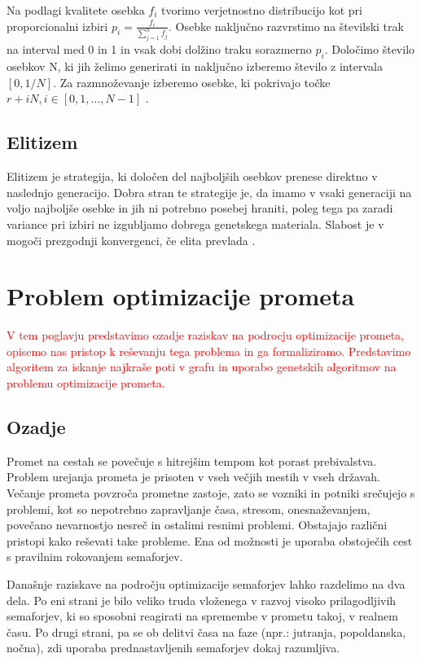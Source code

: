 \documentclass[a4paper, 12pt]{book}
\begin{document}
Na podlagi kvalitete osebka $f_i$ tvorimo verjetnostno distribucijo kot pri proporcionalni izbiri
$p_i = \frac{f_i}{\sum_{j=1}^n f_j}$. Osebke naklju\v cno razvrstimo na \v stevilski trak na interval med 0 in 1 in vsak dobi dol\v zino traku sorazmerno $p_i$. Dolo\v cimo \v stevilo osebkov N, ki jih \v zelimo generirati in naklju\v cno izberemo \v stevilo z intervala $[0, 1/N]$. Za razmno\v zevanje izberemo osebke, ki pokrivajo to\v cke $r + iN, i \in [0, 1, \dots, N -1]$ \cite{inteligentni sistemi}.

\section{Elitizem}
Elitizem je strategija, ki dolo\v cen del najbolj\v sih osebkov prenese direktno v naslednjo generacijo. Dobra stran te strategije je, da imamo v vsaki generaciji na voljo najbolj\v se osebke in jih ni potrebno posebej hraniti, poleg tega pa zaradi variance pri izbiri ne izgubljamo dobrega genetskega materiala. Slabost je v mogo\v ci prezgodnji konvergenci, \v ce elita prevlada
\cite{inteligentni sistemi}.

\chapter{Problem optimizacije prometa}
\label{ch2}
\textcolor{red}{V tem poglavju predstavimo ozadje raziskav na podrocju optimizacije prometa, opisemo nas pristop k re\v sevanju tega problema in ga formaliziramo. Predstavimo algoritem za iskanje najkra\v se poti v grafu in uporabo genetskih algoritmov na problemu optimizacije prometa.}

\section{Ozadje}
Promet na cestah se pove\v cuje s hitrej\v sim tempom kot porast prebivalstva. Problem urejanja prometa je prisoten v vseh ve\v cjih mestih v vseh dr\v zavah. Ve\v canje prometa povzro\v ca prometne zastoje, zato se vozniki in potniki sre\v cujejo s problemi, kot so nepotrebno zapravljanje \v casa, stresom, onesna\v zevanjem, pove\v cano nevarnostjo nesre\v c in ostalimi resnimi problemi. Obstajajo razli\v cni pristopi kako re\v sevati take probleme. Ena od mo\v znosti je uporaba obstoje\v cih cest s pravilnim rokovanjem semaforjev. 

Dana\v snje raziskave na podro\v cju optimizacije semaforjev lahko razdelimo na dva dela. Po eni strani je bilo veliko truda vlo\v zenega v razvoj visoko prilagodljivih semaforjev, ki so sposobni reagirati na spremembe v prometu takoj, v realnem \v casu. Po drugi strani, pa se ob delitvi \v casa na  faze (npr.: jutranja, popoldanska, no\v cna), zdi uporaba prednastavljenih semaforjev dokaj razumljiva.
\end{document}
